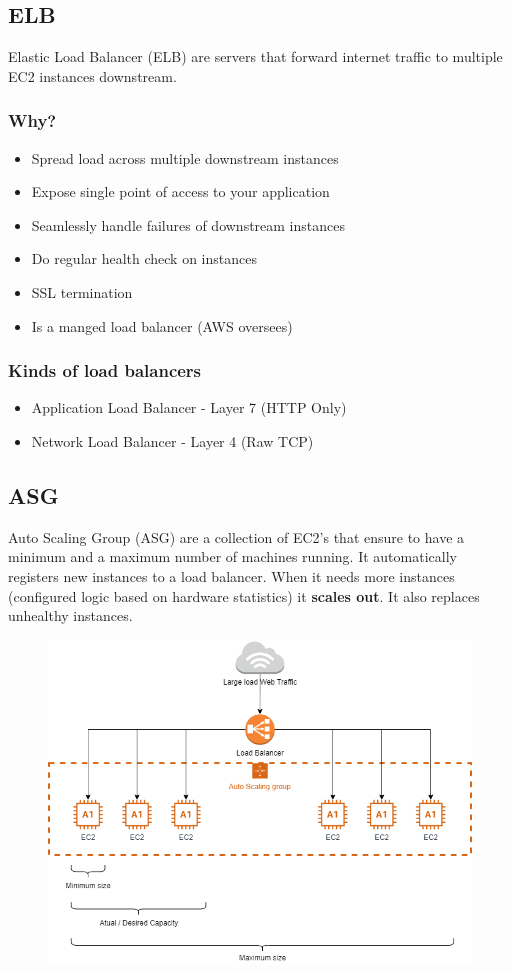 \subsection{ELB}\label{subsec:elb}
Elastic Load Balancer (ELB) are servers that forward internet traffic to multiple EC2 instances downstream.

\subsubsection{Why?}
\begin{itemize}
	\item{Spread load across multiple downstream instances}
	\item{Expose single point of access to your application}
	\item{Seamlessly handle failures of downstream instances}
	\item{Do regular health check on instances}
	\item{SSL termination}
	\item{Is a manged load balancer (AWS oversees)} 
\end{itemize}

\subsubsection{Kinds of load balancers}
\begin{itemize}
	\item{Application Load Balancer} - Layer 7 (HTTP Only)
	\item{Network Load Balancer} - Layer 4 (Raw TCP)
\end{itemize}

\subsection{ASG}\label{subsec:asg}
Auto Scaling Group (ASG) are a collection of EC2's that ensure to have a minimum and a maximum number of machines running.
It automatically registers new instances to a load balancer.
When it needs more instances (configured logic based on hardware statistics) it \textbf{scales out}\@.
It also replaces unhealthy instances.

\begin{figure}[h]
\includegraphics[scale=0.5]{elb_asg/elb_asg}
\centering\label{fig:elb_asg}
\end{figure}
